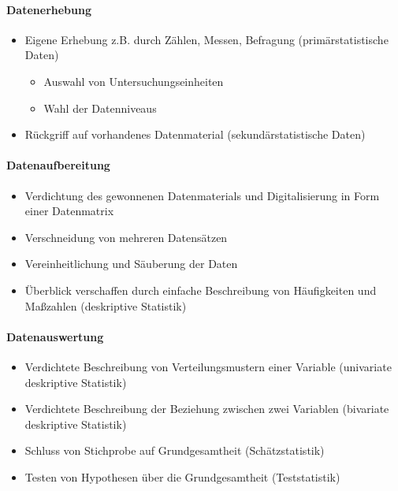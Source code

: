 \documentclass[
  ngerman,
]{article}
\providecommand{\tightlist}{%
  \setlength{\itemsep}{0pt}\setlength{\parskip}{0pt}}
\begin{document}
\hypertarget{datenerhebung}{%
\paragraph{Datenerhebung}\label{datenerhebung}}

\begin{itemize}
\tightlist
\item
  Eigene Erhebung z.B. durch Zählen, Messen, Befragung (primärstatistische Daten)

  \begin{itemize}
  \tightlist
  \item
    Auswahl von Untersuchungseinheiten
  \item
    Wahl der Datenniveaus
  \end{itemize}
\item
  Rückgriff auf vorhandenes Datenmaterial (sekundärstatistische Daten)
\end{itemize}

\hypertarget{datenaufbereitung}{%
\paragraph{Datenaufbereitung}\label{datenaufbereitung}}

\begin{itemize}
\tightlist
\item
  Verdichtung des gewonnenen Datenmaterials und Digitalisierung in Form einer Datenmatrix
\item
  Verschneidung von mehreren Datensätzen
\item
  Vereinheitlichung und Säuberung der Daten
\item
  Überblick verschaffen durch einfache Beschreibung von Häufigkeiten und Maßzahlen (deskriptive Statistik)
\end{itemize}

\hypertarget{datenauswertung}{%
\paragraph{Datenauswertung}\label{datenauswertung}}

\begin{itemize}
\tightlist
\item
  Verdichtete Beschreibung von Verteilungsmustern einer Variable (univariate deskriptive Statistik)
\item
  Verdichtete Beschreibung der Beziehung zwischen zwei Variablen (bivariate deskriptive Statistik)
\item
  Schluss von Stichprobe auf Grundgesamtheit (Schätzstatistik)
\item
  Testen von Hypothesen über die Grundgesamtheit (Teststatistik)
\end{itemize}
\end{document}
